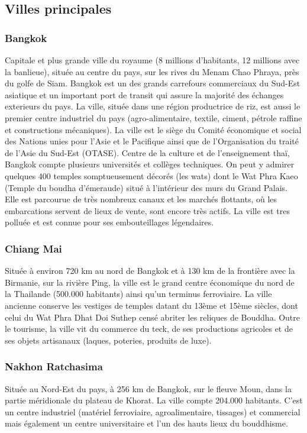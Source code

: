 \begin{multicols}{2}
\subsection{Villes principales}

\subsubsection{Bangkok}
Capitale et plus grande ville du royaume (8 millions d’habitants, 12 millions avec la banlieue), située au centre du pays, sur les rives du Menam Chao Phraya, près du golfe de Siam. Bangkok est un des grands carrefours commerciaux du Sud-Est asiatique et un important port de transit qui assure la majorité des échanges exterieurs du pays. La ville, située dans une région productrice de riz, est aussi le premier centre industriel du pays (agro-alimentaire, textile, ciment, pétrole raffine et constructions mécaniques). La ville est le siège du Comité économique et social des Nations unies pour l’Asie et le Pacifique ainsi que de l’Organisation du traité de l’Asie du Sud-Est (OTASE). Centre de la culture et de l’enseignement thaï, Bangkok compte plusieurs universités et collèges techniques. On peut y admirer quelques 400 temples somptueusement décorés (les wats) dont le Wat Phra Kaeo (Temple du boudha d’émeraude) situé à l’intérieur des murs du Grand Palais. Elle est parcourue de très nombreux canaux et les marchés flottants, où les embarcations servent de lieux de vente, sont encore très actifs. La ville est tres polluée et est connue pour ses embouteillages légendaires.

\subsubsection{Chiang Mai}
Située à environ 720 km au nord de Bangkok et à 130 km de la frontière avec la Birmanie, sur la rivière Ping, la ville est le grand centre économique du nord de la Thailande (500.000 habitants) ainsi qu’un terminus ferroviaire. La ville ancienne conserve les vestiges de temples datant du 13ème et 15ème siècles, dont celui du Wat Phra Dhat Doi Suthep censé abriter les reliques de Bouddha. Outre le tourisme, la ville vit du commerce du teck, de ses productions agricoles et de ses objets artisanaux (laques, poteries, produits de luxe).

\subsubsection{Nakhon Ratchasima}
Située au Nord-Est du pays, à 256 km de Bangkok, sur le fleuve Moun, dans la partie méridionale du plateau de Khorat. La ville compte 204.000 habitants. C’est un centre industriel (matériel ferroviaire, agroalimentaire, tissages) et commercial mais également un centre universitaire et l’un des hauts lieux du bouddhisme.

\end{multicols}


